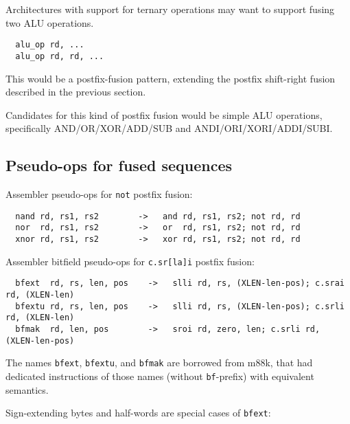 Architectures with support for ternary operations may want to support fusing two ALU operations.

\begin{minipage}{\linewidth}
\begin{verbatim}
  alu_op rd, ...
  alu_op rd, rd, ...
\end{verbatim}
\end{minipage}

This would be a postfix-fusion pattern, extending the postfix shift-right
fusion described in the previous section.

Candidates for this kind of postfix fusion would be simple ALU operations, specifically
AND/OR/XOR/ADD/SUB and ANDI/ORI/XORI/ADDI/SUBI.


\subsection{Pseudo-ops for fused sequences}

Assembler pseudo-ops for {\tt not} postfix fusion:

\begin{minipage}{\linewidth}
\begin{verbatim}
  nand rd, rs1, rs2        ->   and rd, rs1, rs2; not rd, rd
  nor  rd, rs1, rs2        ->   or  rd, rs1, rs2; not rd, rd
  xnor rd, rs1, rs2        ->   xor rd, rs1, rs2; not rd, rd
\end{verbatim}
\end{minipage}

Assembler bitfield pseudo-ops for {\tt c.sr[la]i} postfix fusion:

\begin{minipage}{\linewidth}
\begin{verbatim}
  bfext  rd, rs, len, pos    ->   slli rd, rs, (XLEN-len-pos); c.srai rd, (XLEN-len)
  bfextu rd, rs, len, pos    ->   slli rd, rs, (XLEN-len-pos); c.srli rd, (XLEN-len)
  bfmak  rd, len, pos        ->   sroi rd, zero, len; c.srli rd, (XLEN-len-pos)
\end{verbatim}
\end{minipage}

The names {\tt bfext}, {\tt bfextu}, and {\tt bfmak} are borrowed from m88k, that had
dedicated instructions of those names (without {\tt bf}-prefix) with equivalent semantics.~\cite[p.~3-28]{m88k}

Sign-extending bytes and half-words are special cases of {\tt bfext}:

